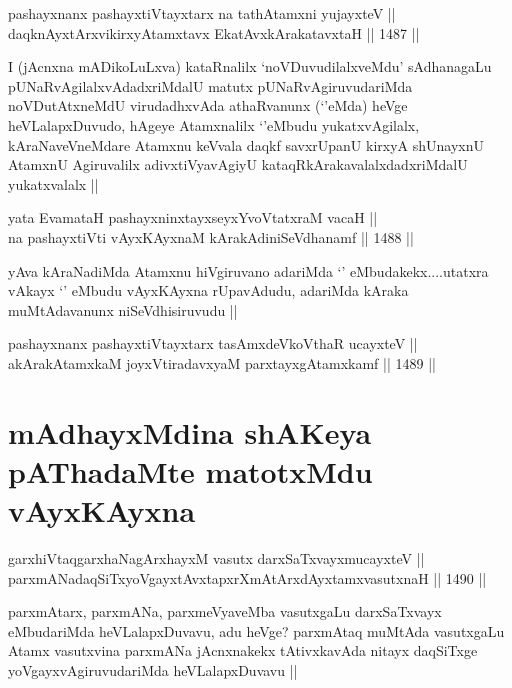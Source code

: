 \begin{shl}
pashayxnanx pashayxtiVtayxtarx na tathA\s \s tamxni yujayxteV ||  \\
daqknAyxtArxvikirxyAtamxtavx EkatAvxkArakatavxtaH ||  1487 ||  
\end{shl}

\begin{artha}
I (jAcnxna mADikoLuLxva) kataRnalilx `noVDuvudilalxveMdu' sAdhanagaLu pUNaRvAgilalxvAdadxriMdalU matutx pUNaRvAgiruvudariMda noVDutAtxneMdU virudadhxvAda athaRvanunx (`\stext'eMda) heVge heVLalapxDuvudo, hAgeye Atamxnalilx `\stext'eMbudu yukatxvAgilalx, kAraNaveVneMdare Atamxnu keVvala daqkf savxrUpanU kirxyA shUnayxnU AtamxnU Agiruvalilx adivxtiVyavAgiyU kataqRkArakavalalxdadxriMdalU yukatxvalalx ||
\end{artha}


\begin{shl}
yata EvamataH pashayxninxtayxseyxYvoVtatxraM vacaH || \\
na pashayxtiVti vAyxKAyxnaM kArakAdiniSeVdhanamf ||  1488 ||  
\end{shl}

\begin{artha}
yAva kAraNadiMda Atamxnu hiVgiruvano adariMda `\stext' eMbudakekx....utatxra vAkayx `\stext' eMbudu vAyxKAyxna rUpavAdudu, adariMda kAraka muMtAdavanunx niSeVdhisiruvudu ||
\end{artha}

\begin{shl}
pashayxnanx pashayxtiVtayxtarx tasAmxdeVkoV\s thaR ucayxteV ||  \\
akArakAtamxkaM joyxVtiradavxyaM parxtayxgAtamxkamf ||  1489 || 
\end{shl}

\section*{mAdhayxMdina shAKeya pAThadaMte matotxMdu vAyxKAyxna}


\begin{shl}
garxhiVtaqgarxhaNagArxhayxM vasutx darxSaTxvayxmucayxteV || \\
parxmANadaqSiTxyoVgayxtAvxtapxrXmAtArxdAyxtamxvasutxnaH ||  1490 ||  
\end{shl}

\begin{artha}
parxmAtarx, parxmANa, parxmeVyaveMba vasutxgaLu darxSaTxvayx eMbudariMda heVLalapxDuvavu, adu heVge? parxmAtaq muMtAda vasutxgaLu Atamx vasutxvina parxmANa jAcnxnakekx tAtivxkavAda nitayx daqSiTxge yoVgayxvAgiruvudariMda heVLalapxDuvavu ||
\end{artha}


